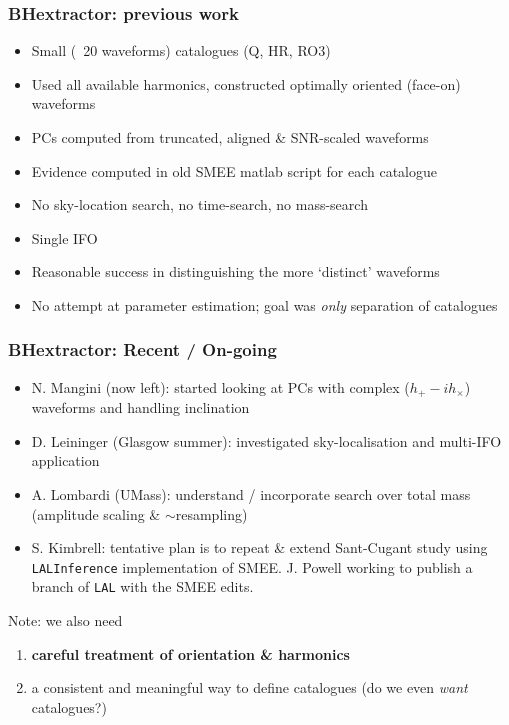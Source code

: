 \documentclass{beamer}
\begin{document}
\begin{frame}
    \frametitle{BHextractor: previous work}
    \begin{itemize}
        \item Small (~20 waveforms) catalogues (Q, HR, RO3)
        \item Used all available harmonics, constructed optimally oriented
            (face-on) waveforms
        \item PCs computed from truncated, aligned \& SNR-scaled waveforms
        \item Evidence computed in old SMEE matlab script for each catalogue
        \item No sky-location search, no time-search, no mass-search
        \item Single IFO
        \item Reasonable success in distinguishing the more `distinct' waveforms
        \item No attempt at parameter estimation; goal was \emph{only}
            separation of catalogues
    \end{itemize}
\end{frame}

\begin{frame}
    \frametitle{BHextractor: Recent / On-going}
    \begin{itemize}
        \item N. Mangini (now left): started looking at PCs with complex ($h_+ -
            i h_{\times}$) waveforms and handling inclination
        \item D. Leininger (Glasgow summer): investigated sky-localisation and
            multi-IFO application
        \item A. Lombardi (UMass):  understand / incorporate search over total
            mass (amplitude scaling \& $\sim$resampling)
        \item S. Kimbrell: tentative plan is to repeat \& extend Sant-Cugant
            study using {\tt LALInference} implementation of SMEE.  J. Powell
            working to publish a branch of {\tt LAL} with the SMEE edits.
    \end{itemize}

    Note: we also need
    \begin{enumerate}
        \item {\bf careful treatment of orientation \& harmonics}
        \item a consistent and meaningful way to define catalogues (do we even
            \emph{want} catalogues?)
    \end{enumerate}

\end{frame}
\end{document}
